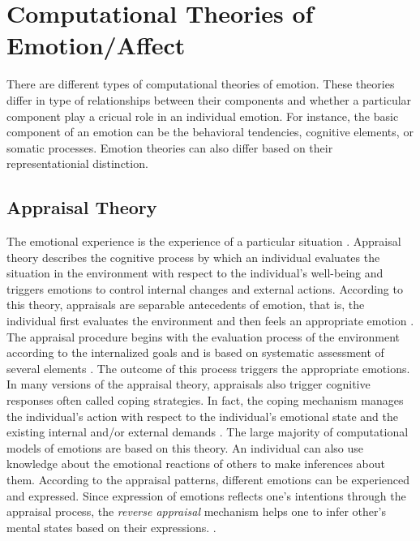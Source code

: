 \documentclass[11pt]{article}
\begin{document}
\section{Computational Theories of Emotion/Affect}

There are different types of computational theories of emotion. These theories
differ in type of relationships between their components and whether a
particular component play a cricual role in an individual emotion. For instance,
the basic component of an emotion can be the behavioral tendencies, cognitive
elements, or somatic processes. Emotion theories can also differ based on their
representationial distinction.

\subsection{Appraisal Theory}

The emotional experience is the experience of a particular situation
\cite{frijda:emotions}. Appraisal theory describes the cognitive process by
which an individual evaluates the situation in the environment with respect to
the individual's well-being and triggers emotions to control internal changes
and external actions. According to this theory, appraisals are separable
antecedents of emotion, that is, the individual first evaluates the environment
and then feels an appropriate emotion \cite{scherer:appraisal-processes}. The
appraisal procedure begins with the evaluation process of the environment
according to the internalized goals and is based on systematic assessment of
several elements \cite{scherer:sequential-appraisal-process}. The outcome of
this process triggers the appropriate emotions. In many versions of the
appraisal theory, appraisals also trigger cognitive responses often called
coping strategies. In fact, the coping mechanism manages the individual's
action with respect to the individual's emotional state and the existing
internal and/or external demands \cite{folkman:coping-pitfalls-promise}. The
large majority of computational models of emotions are based on this theory. An
individual can also use knowledge about the emotional reactions of others to
make inferences about them. According to the appraisal patterns, different
emotions can be experienced and expressed. Since expression of emotions reflects
one's intentions through the appraisal process, the \textit{reverse appraisal}
mechanism helps one to infer other's mental states based on their expressions.
\cite{gratch:reverse-appraisal, hareli:emotional-reaction-perception}.
\end{document}
